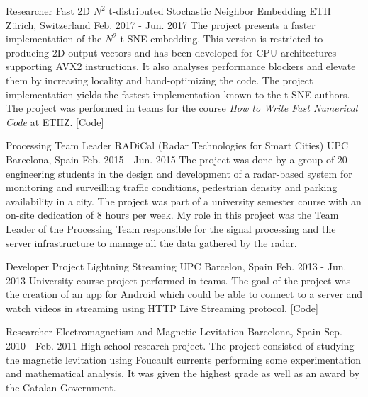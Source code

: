 \begin{cventries}

\cventry
  {Researcher}
  {Fast 2D $N^2$ t-distributed Stochastic Neighbor Embedding}
  {ETH Z\"urich, Switzerland}
  {Feb. 2017 - Jun. 2017}
  {
    The project presents a faster implementation of the $N^2$ t-SNE embedding.
    This version is restricted to producing 2D output vectors and has been
    developed for CPU architectures supporting AVX2 instructions.
    It also analyses performance blockers and elevate them by increasing
    locality and hand-optimizing the code.
    The project implementation yields the fastest implementation known to the
    t-SNE authors.
    The project was performed in teams for the course
    \textit{How to Write Fast Numerical Code} at ETHZ.
    [\href{https://github.com/albertomontesg/fast-tsne}{Code}]
  }

\cventry
  {Processing Team Leader}
  {RADiCal (Radar Technologies for Smart Cities)}
  {UPC Barcelona, Spain}
  {Feb. 2015 - Jun. 2015}
  {
    The project was done by a group of 20 engineering students in the design
    and development of a radar-based system for monitoring and surveilling
    traffic conditions, pedestrian density and parking availability in a city.
    The project was part of a university semester course with an on-site
    dedication of 8 hours per week. My role in this project was the Team Leader
    of the Processing Team responsible for the signal processing and the server
    infrastructure to manage all the data gathered by the radar.
  }

\cventry
  {Developer}
  {Project Lightning Streaming}
  {UPC Barcelon, Spain}
  {Feb. 2013 - Jun. 2013}
  {
    University course project performed in teams. The goal of the project was
    the creation of an app for Android which could be able to connect to a
    server and watch videos in streaming using HTTP Live Streaming protocol.
    [\href{https://github.com/albertomontesg/LightningStreaming}{Code}]
  }

\cventry
  {Researcher}
  {Electromagnetism and Magnetic Levitation}
  {Barcelona, Spain}
  {Sep. 2010 - Feb. 2011}
  {
    High school research project. The project consisted of studying the magnetic
    levitation using Foucault currents performing some experimentation and
    mathematical analysis.
    It was given the highest grade as well as an award by the Catalan
    Government.
  }

\end{cventries}
